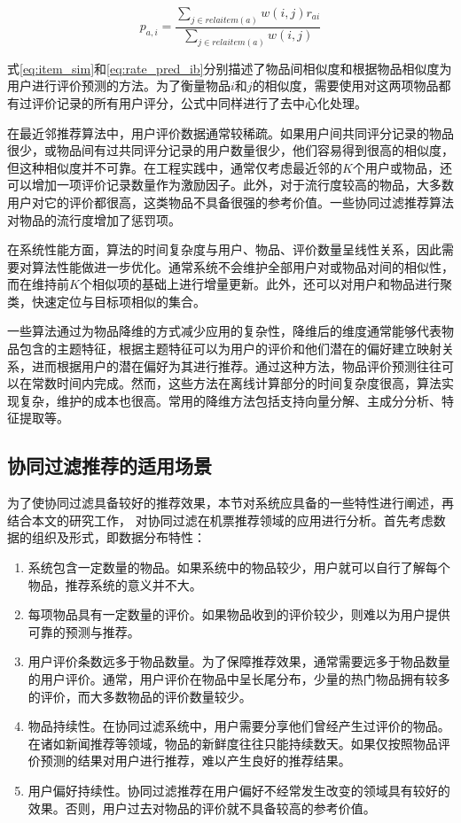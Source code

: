 \begin{equation}
\label{eq:rate_pred_ib}
	p_{a,i} = \frac{\sum_{j \in relaitem(a)}w(i,j)r_{ai}}{\sum_{j \in relaitem(a)}w(i,j)}
\end{equation}

式\ref{eq:item_sim}和\ref{eq:rate_pred_ib}分别描述了物品间相似度和根据物品相似度为用户进行评价预测的方法。为了衡量物品$i$和$j$的相似度，需要使用对这两项物品都有过评价记录的所有用户评分，公式中同样进行了去中心化处理。

在最近邻推荐算法中，用户评价数据通常较稀疏。如果用户间共同评分记录的物品很少，或物品间有过共同评分记录的用户数量很少，他们容易得到很高的相似度，但这种相似度并不可靠。在工程实践中，通常仅考虑最近邻的$K$个用户或物品，还可以增加一项评价记录数量作为激励因子。此外，对于流行度较高的物品，大多数用户对它的评价都很高，这类物品不具备很强的参考价值。一些协同过滤推荐算法\cite{breese1998empirical}对物品的流行度增加了惩罚项。

在系统性能方面，算法的时间复杂度与用户、物品、评价数量呈线性关系，因此需要对算法性能做进一步优化。通常系统不会维护全部用户对或物品对间的相似性，而在维持前$K$个相似项的基础上进行增量更新\cite{herlocker1999algorithmic}。此外，还可以对用户和物品进行聚类，快速定位与目标项相似的集合。

一些算法通过为物品降维的方式减少应用的复杂性，降维后的维度通常能够代表物品包含的主题特征，根据主题特征可以为用户的评价和他们潜在的偏好建立映射关系，进而根据用户的潜在偏好为其进行推荐。通过这种方法，物品评价预测往往可以在常数时间内完成。然而，这些方法在离线计算部分的时间复杂度很高，算法实现复杂，维护的成本也很高。常用的降维方法包括支持向量分解、主成分分析、特征提取等。

\subsection{协同过滤推荐的适用场景}

为了使协同过滤具备较好的推荐效果，本节对系统应具备的一些特性进行阐述，再结合本文的研究工作， 对协同过滤在机票推荐领域的应用进行分析。首先考虑数据的组织及形式，即数据分布特性：

\begin{enumerate}
  \item 系统包含一定数量的物品。如果系统中的物品较少，用户就可以自行了解每个物品，推荐系统的意义并不大。
  \item 每项物品具有一定数量的评价。如果物品收到的评价较少，则难以为用户提供可靠的预测与推荐。
  \item 用户评价条数远多于物品数量。为了保障推荐效果，通常需要远多于物品数量的用户评价。通常，用户评价在物品中呈长尾分布，少量的热门物品拥有较多的评价，而大多数物品的评价数量较少。
  \item 物品持续性。在协同过滤系统中，用户需要分享他们曾经产生过评价的物品。在诸如新闻推荐等领域，物品的新鲜度往往只能持续数天。如果仅按照物品评价预测的结果对用户进行推荐，难以产生良好的推荐结果。
  \item 用户偏好持续性。协同过滤推荐在用户偏好不经常发生改变的领域具有较好的效果。否则，用户过去对物品的评价就不具备较高的参考价值。
\end{enumerate}

